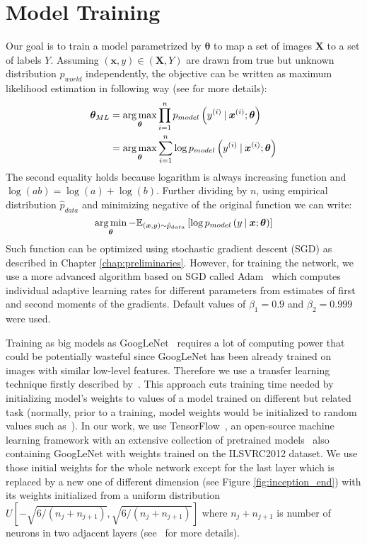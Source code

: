 \section{Model Training}
Our goal is to train a model parametrized by $\bm{\theta}$ to map a set of images $\bm{X}$ to a set of labels $Y$. Assuming $(\bm{x},y)\in(\bm{X},Y)$ are drawn from true but unknown distribution $p_{world}$ independently, the objective can be written as maximum likelihood estimation in following way (see \cite{Goodfellow-et-al-2016} for more details):
\begin{align}
\bm{\theta}_{ML} &=\mathop{\arg\max}_{\bm{\theta}}\prod\limits_{i=1}^{n} p_{model}\left(y^{(i)}\:\vert\:\bm{x}^{(i)};\bm{\theta}\right) \\
&=\mathop{\arg\max}_{\bm{\theta}}\sum\limits_{i=1}^{n} \log p_{model}\left(y^{(i)}\:\vert\:\bm{x}^{(i)};\bm{\theta}\right)
\end{align}
The second equality holds because logarithm is always increasing function and $\log(ab)=\log(a)+\log(b)$. Further dividing by $n$, using empirical distribution $\hat{p}_{data}$ and minimizing negative of the original function we can write:
\begin{equation}
\mathop{\arg\min}_{\bm{\theta}}-\mathbb{E}_{(\bm{x},y)\sim \hat{p}_{data}}\left[\log p_{model}\left(y\:\vert\:\bm{x};\bm{\theta}\right)\right]\label{eq:mle}
\end{equation}
Such function can be optimized using stochastic gradient descent (SGD) as described in Chapter \ref{chap:preliminaries}. However, for training the network, we use a more advanced algorithm based on SGD called Adam~\cite{adam} which computes individual adaptive learning rates for
different parameters from estimates of first and second moments of the gradients. Default values of $\beta_1 = 0.9$ and $\beta_2 = 0.999$ were used.

Training as big models as GoogLeNet~\cite{szegedy2015going} requires a lot of computing power that could be potentially wasteful since GoogLeNet has been already trained on images with similar low-level features. Therefore we use a transfer learning technique firstly described by~\cite{donahue2014decaf}. This approach cuts training time needed by initializing model's weights to values of a model trained on different but related task (normally, prior to a training, model weights would be initialized to random values such as~\cite{glorot2010understanding}). In our work, we use TensorFlow~\cite{tensorflow2015}, an open-source machine learning framework with an extensive collection of pretrained models~\cite{TFmodels} also containing GoogLeNet with weights trained on the ILSVRC2012 dataset. We use those initial weights for the whole network except for the last layer which is replaced by a new one of different dimension (see Figure \ref{fig:inception_end}) with its weights initialized from a uniform distribution $U\left[-\sqrt{6/(n_j+n_{j+1})}, \sqrt{6/(n_j+n_{j+1})}\right]$ where $n_j+n_{j+1}$ is number of neurons in two adjacent layers (see~\cite{glorot2010understanding} for more details).


